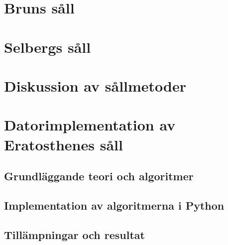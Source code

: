 \documentclass[a4paper]{article}
\begin{document}
\section{Bruns såll} \label{brun}


\section{Selbergs såll} \label{Selberg}


\section{Diskussion av sållmetoder}\label{Diskussion}



\section{Datorimplementation av Eratosthenes såll} \label{partB}


\subsection{Grundläggande teori och algoritmer} \label{partB.algoritmteori}



\subsection{Implementation av algoritmerna i Python}\label{partB.implementering}


\subsection{Tillämpningar och resultat} \label{partB.applications}
 


%
\end{document}
